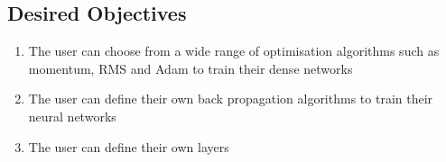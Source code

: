 \subsection{Desired Objectives}
\begin{enumerate}
    \item The user can choose from a wide range of optimisation algorithms such as momentum, RMS and Adam to train their dense networks
    \item The user can define their own back propagation algorithms to train their neural networks
    \item The user can define their own layers
\end{enumerate}